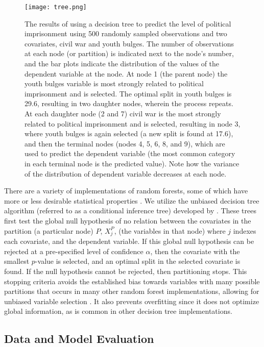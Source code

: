 \documentclass[11pt]{article}
\begin{document}
\begin{figure}[!htpb]
\centering
\texttt{[image: tree.png]}
\caption{The results of using a decision tree to predict the level of political imprisonment using 500 randomly sampled observations and two covariates, civil war and youth bulges. The number of observations at each node (or partition) is indicated next to the node's number, and the bar plots indicate the distribution of the values of the dependent variable at the node. At node 1 (the parent node) the youth bulges variable is most strongly related to political imprisonment and is selected. The optimal split in youth bulges is 29.6, resulting in two daughter nodes, wherein the process repeats. At each daughter node (2 and 7) civil war is the most strongly related to political imprisonment and is selected, resulting in node 3, where youth bulges is again selected (a new split is found at 17.6), and then the terminal nodes (nodes 4, 5, 6, 8, and 9), which are used to predict the dependent variable (the most common category in each terminal node is the predicted value). Note how the variance of the distribution of dependent variable decreases at each node.}
\label{fig:tree}
\end{figure}

There are a variety of implementations of random forests, some of which have more or less desirable statistical properties \citep{strobl2009introduction}. We utilize the unbiased decision tree algorithm (referred to as a conditional inference tree) developed by \citet{hothorn2006unbiased}. These trees first test the global null hypothesis of no relation between the covariates in the partition (a particular node) $P$, $X_j^P$, (the variables in that node) where $j$ indexes each covariate, and the dependent variable. If this global null hypothesis can be rejected at a pre-specified level of confidence $\alpha$, then the covariate with the smallest $p$-value is selected, and an optimal split in the selected covariate is found. If the null hypothesis cannot be rejected, then partitioning stops. This stopping criteria avoids the established bias towards variables with many possible partitions that occurs in many other random forest implementations, allowing for unbiased variable selection \citep{hothorn2006unbiased, strobl2007bias}. It also prevents overfitting since it does not optimize global  information, as is common in other decision tree implementations.

\subsection{Data and Model Evaluation}
\end{document}
